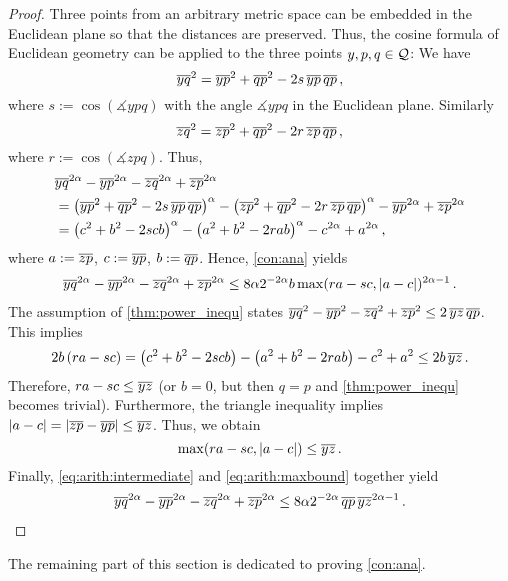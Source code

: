 \begin{proof}
	Three points from an arbitrary metric space can be embedded in the Euclidean plane so that the distances are preserved.
	Thus, the cosine formula of Euclidean geometry can be applied to the three points $y,p,q\in\mathcal{Q}$: We have
	\begin{equation*}
		\overline{yq}^2 = \overline{yp}^2 + \overline{qp}^2 - 2 s \,\overline{yp}\, \overline{qp}\, ,
	\end{equation*}
	where $s := \cos(\measuredangle ypq)$ with the angle $\measuredangle ypq$ in the Euclidean plane.
	Similarly
	\begin{equation*}
		\overline{zq}^2 = \overline{zp}^2 + \overline{qp}^2 - 2 r \,\overline{zp}\, \overline{qp}
		\, ,
	\end{equation*}
	where $r := \cos(\measuredangle zpq)$. Thus,
	\begin{align*}
		&
		\overline{yq}^{2\alpha} - \overline{yp}^{2\alpha} - \overline{zq}^{2\alpha} + \overline{zp}^{2\alpha}
		\\&=
		\left( \overline{yp}^2 + \overline{qp}^2 - 2 s \,\overline{yp}\, \overline{qp} \right)^\alpha
		-
		\left( \overline{zp}^2 + \overline{qp}^2 - 2 r \,\overline{zp}\, \overline{qp} \right)^\alpha
		- \overline{yp}^{2\alpha}
		+ \overline{zp}^{2\alpha}
		\\&=
		\left( c^2 + b^2 - 2 s cb \right)^\alpha
		-
		\left( a^2 + b^2 - 2 r ab \right)^\alpha
		- c^{2\alpha}
		+ a^{2\alpha}
		\, ,
	\end{align*}
	where $a:=\overline{zp}$, $c:=\overline{yp}$, $b:=\overline{qp}$.
	Hence, \autoref{con:ana} yields
	\begin{align}\label{eq:arith:intermediate}
		\overline{yq}^{2\alpha} - \overline{yp}^{2\alpha} - \overline{zq}^{2\alpha} + \overline{zp}^{2\alpha}
		\leq
		8 \alpha 2^{-2\alpha} b \max(ra - sc, |a-c|)^{2\alpha-1}
		\, .
	\end{align}
	The assumption of \autoref{thm:power_inequ} states $\overline{yq}^{2} - \overline{yp}^{2} - \overline{zq}^{2} + \overline{zp}^{2} \leq 2 \, \overline{yz}\, \overline{qp}$.
	This implies
	\begin{equation*}
		2b \left( ra-sc \right)
		=
		\left( c^2 + b^2 - 2 scb \right)
		-
		\left( a^2 + b^2 - 2 rab \right)
		- c^{2}
		+ a^{2}
		\leq 
		2 b\,
		\overline{yz}
		\, .
	\end{equation*}
	Therefore, $ra-sc \leq \overline{yz}$ (or $b=0$, but then $q=p$ and \autoref{thm:power_inequ} becomes trivial).
	Furthermore, the triangle inequality implies $|a-c| = |\overline{zp}-\overline{yp}| \leq \overline{yz}$.
	Thus, we obtain
	\begin{equation}\label{eq:arith:maxbound}
		\max(ra - sc, |a-c|) \leq\overline{yz}
		\, .
	\end{equation}
	Finally, \eqref{eq:arith:intermediate} and \eqref{eq:arith:maxbound} together yield
	\begin{align*}
		\overline{yq}^{2\alpha} - \overline{yp}^{2\alpha} - \overline{zq}^{2\alpha} + \overline{zp}^{2\alpha}
		\leq
		8 \alpha 2^{-2\alpha}  \,\overline{qp}\, \overline{yz}^{2\alpha-1}
		\, .
	\end{align*}
\end{proof}
%
The remaining part of this section is dedicated to proving \autoref{con:ana}.

